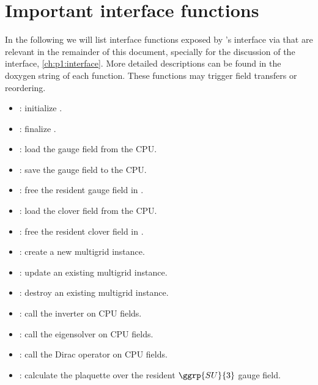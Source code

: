 \section{Important interface functions}

In the following we will list interface functions exposed by \quda's interface via  that are relevant in the remainder of this document, specially for the discussion of the interface, \cref{ch:p1:interface}.
More detailed descriptions can be found in the doxygen string of each function.
These functions may trigger field transfers or reordering.

\begin{itemize}
  \item {}: initialize \quda.
  \item {}: finalize \quda.
  \item {}: load the gauge field from the CPU.
  \item {}: save the gauge field to the CPU.
  \item {}: free the resident gauge field in \quda.
  \item {}: load the clover field from the CPU.
  \item {}: free the resident clover field in \quda.
  \item {}: create a new multigrid instance.
  \item {}: update an existing multigrid instance.
  \item {}: destroy an existing multigrid instance.
  \item {}: call the inverter on CPU fields.
  \item {}: call the eigensolver on CPU fields.
  \item {}: call the Dirac operator on CPU fields.
  \item {}: calculate the plaquette over the resident $\ggrp{SU}{3}$ gauge field.
\end{itemize} 

